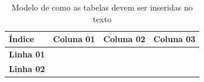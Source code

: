 \begin{table}[h]
\centering
\caption{ Modelo de como as tabelas devem ser inseridas no texto }
\vspace{0.2in}
%
\newcommand{\rowstyle}[1]{%
  \protected\gdef\currentrowstyle{#1}%
}
\begin{tabularx}{\textwidth}{>{\bf}C|C|C|C}
\hline 
\textbf {Índice} & \textbf{Coluna 01} &\textbf{ Coluna 02} & \textbf{Coluna 03} \\ \hline \hline
Linha 01 & & & \\ \hline
Linha 02 & & & \\ \hline                         

\end{tabularx}
\end{table}